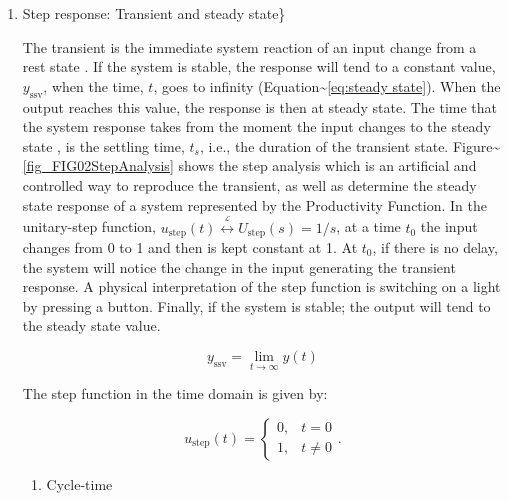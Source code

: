 \documentclass{article}
\begin{document}
\begin{enumerate}
\item Step response: Transient and steady state\}
\label{sec:org2064630}

The transient is the immediate system reaction of an input change from a rest state \citep{Ogata2010}.
If the system is stable, the response will tend to a constant value, \(y_{\mbox{ssv}}\), when the time, \(t\), goes to infinity (Equation\textasciitilde{}\ref{eq:steady state}).
When the output reaches this value, the response is then at steady state.
The time that the system response takes from the moment the input changes to the steady state \citep{Nise2010,Ogata2010}, is the settling time, \(t_s\), i.e., the duration of the transient state.
Figure\textasciitilde{}\ref{fig_FIG02StepAnalysis} shows the step analysis which is an artificial and controlled way to reproduce the transient, as well as determine the steady state response of a system represented by the Productivity Function.
In the unitary-step function, \(u_{\mbox{step}}(t) \overset{\underset{\mathrm{\mathcal{L}}}{}}{\leftrightarrow} U_{\mbox{step}}(s) = 1/s\), at a time \(t_0\) the input changes from 0 to 1 and then is kept constant at 1.
At \(t_0\), if there is no delay, the system will notice the change in the input generating the transient response.
A physical interpretation of the step function is switching on a light by pressing a button.
Finally, if the system is stable; the output will tend to the steady state value.

\begin{equation}\label{eq:steady state}
	y_{\mbox{ssv}} = \lim_{t\rightarrow \infty} y(t)
\end{equation}

The step function in the time domain is given by:

\begin{equation}\label{eq:Step function in time domain P7}
	u_{\mbox{step}}(t) =
	\begin{cases}
 	0, & t = 0 \\
  	1, & t \ne 0
	\end{cases}.
\end{equation}


\begin{enumerate}
\item Cycle-time
\label{sec:orgf84f6aa}


\end{enumerate}
\end{enumerate}
\end{document}
